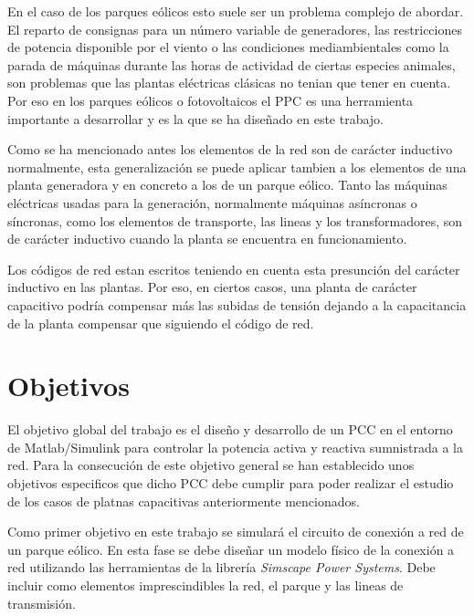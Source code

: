 \documentclass{book}
\begin{document}
En el caso de los parques e\'olicos esto suele ser un problema complejo de abordar. El reparto de consignas para un n\'umero variable de generadores, las restricciones de potencia disponible por el viento o las condiciones mediambientales como la parada de m\'aquinas durante las horas de actividad de ciertas especies animales, son problemas que las plantas el\'ectricas cl\'asicas no tenian que tener en cuenta. Por eso en los parques e\'olicos o fotovoltaicos el PPC es una herramienta importante a desarrollar y es la que se ha diseñado en este trabajo. \par 

Como se ha mencionado antes los elementos de la red son de car\'acter inductivo normalmente, esta generalizaci\'on se puede aplicar tambien a los elementos de una planta generadora y en concreto a los de un parque e\'olico. Tanto las m\'aquinas el\'ectricas usadas para la generaci\'on, normalmente m\'aquinas as\'incronas o s\'incronas, como los elementos de transporte, las lineas y los transformadores, son de car\'acter inductivo cuando la planta se encuentra en funcionamiento.\par

Los c\'odigos de red estan escritos teniendo en cuenta esta presunci\'on del car\'acter inductivo en las plantas. Por eso, en ciertos casos, una planta de car\'acter capacitivo podr\'ia compensar m\'as las subidas de tensi\'on dejando a la capacitancia de la planta compensar que siguiendo el c\'odigo de red. \par



	\section{Objetivos}

El objetivo global del trabajo es el diseño y desarrollo de un PCC en el entorno de Matlab/Simulink para controlar la potencia activa y reactiva sumnistrada a la red. Para la consecuci\'on de este objetivo general se han establecido unos objetivos especificos que dicho PCC debe cumplir para poder realizar el estudio de los casos de platnas capacitivas anteriormente mencionados. \par

Como primer objetivo en este trabajo se simular\'a el circuito de conexi\'on a red de un parque e\'olico. En esta fase se debe diseñar un modelo f\'isico de la conexi\'on a red utilizando las herramientas de la librer\'ia \emph{Simscape Power Systems}. Debe incluir como elementos imprescindibles la red, el parque y las lineas de transmisi\'on. \par
\end{document}
